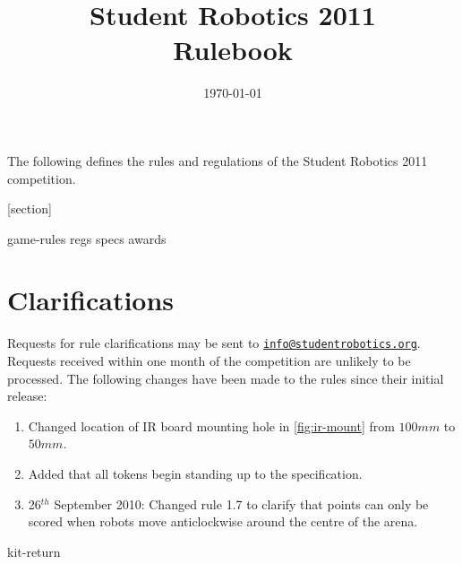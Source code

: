 \documentclass[a4paper, 12pt]{scrartcl}
\title {Student Robotics 2011\\ Rulebook}
\date{\today}
\begin{document}
\maketitle

\noindent The following defines the rules and regulations of the Student Robotics 2011 competition.

[section]
\newcommand{\rcn}{\stepcounter{rule}\arabic{section}.\arabic{rule}}
\renewcommand{\labelenumi}{\rcn}

 {game-rules}
\newpage
 {regs}
\newpage
 {specs}
\newpage
 {awards}

\renewcommand{\labelenumi}{\rcn}

\section{Clarifications}
Requests for rule clarifications may be sent to \href{mailto:info@studentrobotics.org}{\nolinkurl{info@studentrobotics.org}}.  Requests received within one month of the competition are unlikely to be processed.
The following changes have been made to the rules since their initial release:

\begin{enumerate}
\item Changed location of IR board mounting hole in \autoref{fig:ir-mount} from $100mm$ to $50mm$.
\item Added that all tokens begin standing up to the  specification.
\item 26$^{th}$ September 2010: Changed rule 1.7 to clarify that points can only be scored when robots move anticlockwise around the centre of the arena.
\end{enumerate}

\newpage
\appendix
\appendixpage
\addappheadtotoc
 {kit-return}
\end{document}
